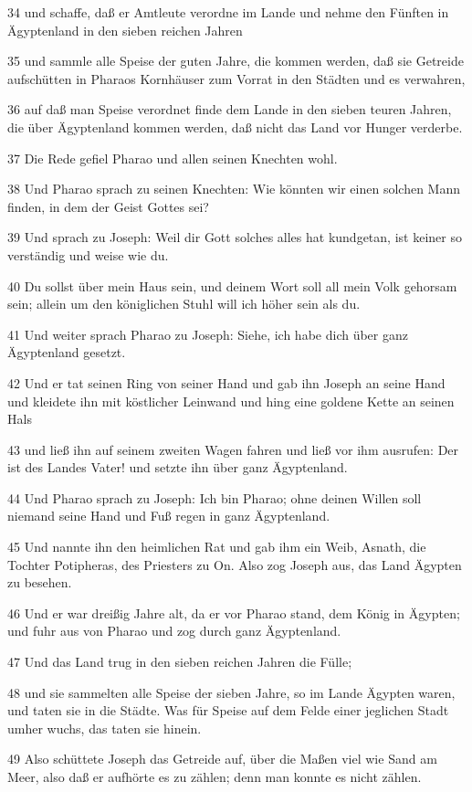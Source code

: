 \par 34 und schaffe, daß er Amtleute verordne im Lande und nehme den Fünften in Ägyptenland in den sieben reichen Jahren
\par 35 und sammle alle Speise der guten Jahre, die kommen werden, daß sie Getreide aufschütten in Pharaos Kornhäuser zum Vorrat in den Städten und es verwahren,
\par 36 auf daß man Speise verordnet finde dem Lande in den sieben teuren Jahren, die über Ägyptenland kommen werden, daß nicht das Land vor Hunger verderbe.
\par 37 Die Rede gefiel Pharao und allen seinen Knechten wohl.
\par 38 Und Pharao sprach zu seinen Knechten: Wie könnten wir einen solchen Mann finden, in dem der Geist Gottes sei?
\par 39 Und sprach zu Joseph: Weil dir Gott solches alles hat kundgetan, ist keiner so verständig und weise wie du.
\par 40 Du sollst über mein Haus sein, und deinem Wort soll all mein Volk gehorsam sein; allein um den königlichen Stuhl will ich höher sein als du.
\par 41 Und weiter sprach Pharao zu Joseph: Siehe, ich habe dich über ganz Ägyptenland gesetzt.
\par 42 Und er tat seinen Ring von seiner Hand und gab ihn Joseph an seine Hand und kleidete ihn mit köstlicher Leinwand und hing eine goldene Kette an seinen Hals
\par 43 und ließ ihn auf seinem zweiten Wagen fahren und ließ vor ihm ausrufen: Der ist des Landes Vater! und setzte ihn über ganz Ägyptenland.
\par 44 Und Pharao sprach zu Joseph: Ich bin Pharao; ohne deinen Willen soll niemand seine Hand und Fuß regen in ganz Ägyptenland.
\par 45 Und nannte ihn den heimlichen Rat und gab ihm ein Weib, Asnath, die Tochter Potipheras, des Priesters zu On. Also zog Joseph aus, das Land Ägypten zu besehen.
\par 46 Und er war dreißig Jahre alt, da er vor Pharao stand, dem König in Ägypten; und fuhr aus von Pharao und zog durch ganz Ägyptenland.
\par 47 Und das Land trug in den sieben reichen Jahren die Fülle;
\par 48 und sie sammelten alle Speise der sieben Jahre, so im Lande Ägypten waren, und taten sie in die Städte. Was für Speise auf dem Felde einer jeglichen Stadt umher wuchs, das taten sie hinein.
\par 49 Also schüttete Joseph das Getreide auf, über die Maßen viel wie Sand am Meer, also daß er aufhörte es zu zählen; denn man konnte es nicht zählen.
